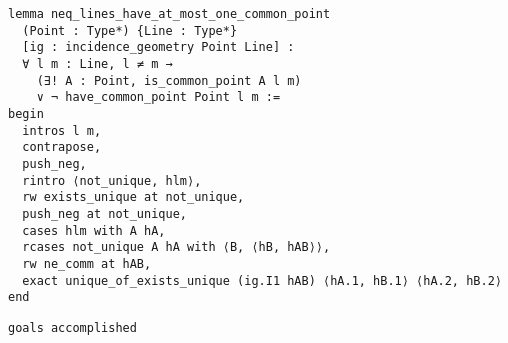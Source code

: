 \begin{frame}[fragile]
	\begin{multicols}{2}
		\begin{lstlisting}
lemma neq_lines_have_at_most_one_common_point 
  (Point : Type*) {Line : Type*} 
  [ig : incidence_geometry Point Line] :
  ∀ l m : Line, l ≠ m → 
    (∃! A : Point, is_common_point A l m) 
    ∨ ¬ have_common_point Point l m := 
begin
  intros l m,
  contrapose,
  push_neg,
  rintro ⟨not_unique, hlm⟩,
  rw exists_unique at not_unique,
  push_neg at not_unique,
  cases hlm with A hA,
  rcases not_unique A hA with ⟨B, ⟨hB, hAB⟩⟩,
  rw ne_comm at hAB,
  exact unique_of_exists_unique (ig.I1 hAB) ⟨hA.1, hB.1⟩ ⟨hA.2, hB.2⟩
end
\end{lstlisting}
		\columnbreak
		\lstinline{goals accomplished} \checkmark
	\end{multicols}
\end{frame}
























